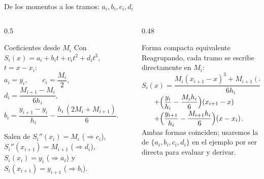 \documentclass[aspectratio=169,10pt]{beamer}
\begin{document}
\begin{frame}{De los momentos a los tramos: $a_i,b_i,c_i,d_i$}
\begin{columns}[T]
\begin{column}{0.5\textwidth}
\begin{cardidea}{Coeficientes desde $M_i$}{\faSuperscript}
{\footnotesize Con $S_i(x)=a_i+b_it+c_it^2+d_it^3$, $t=x-x_i$:\\[0.8mm]
$a_i=y_i,\qquad c_i=\dfrac{M_i}{2},$\\[1.0mm]
$d_i=\dfrac{M_{i+1}-M_i}{6h_i},$\\[1.0mm]
$b_i=\dfrac{y_{i+1}-y_i}{h_i}-\dfrac{h_i\,(2M_i+M_{i+1})}{6}.$}
\end{cardidea}
\vspace{1mm}
\begin{cardnota}[\faInfoCircle]
{\footnotesize Salen de $S_i''(x_i)=M_i$ ($\Rightarrow c_i$), $S_i''(x_{i+1})=M_{i+1}$ ($\Rightarrow d_i$), $S_i(x_i)=y_i$ ($\Rightarrow a_i$) y $S_i(x_{i+1})=y_{i+1}$ ($\Rightarrow b_i$).}
\end{cardnota}
\end{column}
\begin{column}{0.48\textwidth}
\begin{cardgear}{Forma compacta equivalente}{\faCogs}
{\footnotesize Reagrupando, cada tramo se escribe directamente en $M_i$:\\[0.8mm]
$S_i(x)=\dfrac{M_i(x_{i+1}-x)^3+M_{i+1}(x-x_i)^3}{6h_i}$\\[1.0mm]
$\hspace{6mm}+\Big(\dfrac{y_i}{h_i}-\dfrac{M_ih_i}{6}\Big)(x_{i+1}-x)$\\[1.0mm]
$\hspace{6mm}+\Big(\dfrac{y_{i+1}}{h_i}-\dfrac{M_{i+1}h_i}{6}\Big)(x-x_i)$.\\[1.2mm]
Ambas formas coinciden; usaremos la de $\{a_i,b_i,c_i,d_i\}$ en el ejemplo por ser directa para evaluar y derivar.}
\end{cardgear}
\end{column}
\end{columns}
\end{frame}
\end{document}
